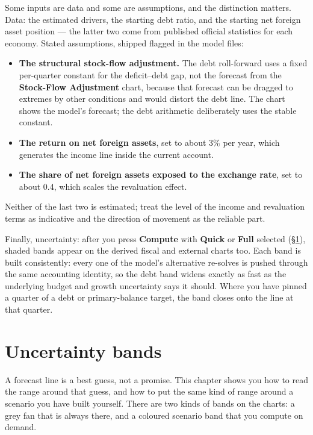 \documentclass[11pt]{article}
\theoremstyle{definition}
\theoremstyle{remark}
\begin{document}
Some inputs are data and some are assumptions, and the distinction matters. Data: the estimated
drivers, the starting debt ratio, and the starting net foreign asset position --- the latter
two come from published official statistics for each economy. Stated assumptions, shipped
flagged in the model files:
\begin{itemize}
  \item \textbf{The structural stock-flow adjustment.} The debt roll-forward uses a fixed
    per-quarter constant for the deficit--debt gap, not the forecast from the
    \textbf{Stock-Flow Adjustment} chart, because that forecast can be dragged to extremes by
    other conditions and would distort the debt line. The chart shows the model's forecast; the
    debt arithmetic deliberately uses the stable constant.
  \item \textbf{The return on net foreign assets}, set to about 3\% per year, which generates
    the income line inside the current account.
  \item \textbf{The share of net foreign assets exposed to the exchange rate}, set to about
    0.4, which scales the revaluation effect.
\end{itemize}
Neither of the last two is estimated; treat the level of the income and revaluation terms as
indicative and the direction of movement as the reliable part.

Finally, uncertainty: after you press \textbf{Compute} with \textbf{Quick} or \textbf{Full}
selected (\S\ref{sec:use-uncertainty}), shaded bands appear on the derived fiscal and external
charts too. Each band is built consistently: every one of the model's alternative re-solves is
pushed through the same accounting identity, so the debt band widens exactly as fast as the
underlying budget and growth uncertainty says it should. Where you have pinned a quarter of a
debt or primary-balance target, the band closes onto the line at that quarter.

\section{Uncertainty bands}\label{sec:use-uncertainty}

A forecast line is a best guess, not a promise. This chapter shows you how to read the
range around that guess, and how to put the same kind of range around a scenario you
have built yourself. There are two kinds of bands on the charts: a grey fan that is
always there, and a coloured scenario band that you compute on demand.
\end{document}
